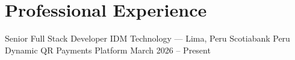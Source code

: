
\section{Professional Experience}

\cvEntryClient%
  {Senior Full Stack Developer}%
  {IDM Technology --- Lima, Peru}%
  {Scotiabank Peru}%
  {Dynamic QR Payments Platform}%
  {March 2026 -- Present}

